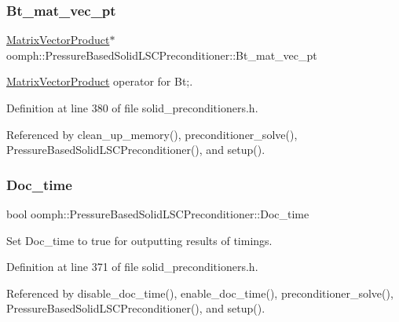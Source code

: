 \subsubsection{\texorpdfstring{Bt\+\_\+mat\+\_\+vec\+\_\+pt}{Bt\_mat\_vec\_pt}}
{\footnotesize\ttfamily \hyperlink{classoomph_1_1MatrixVectorProduct}{Matrix\+Vector\+Product}$\ast$ oomph\+::\+Pressure\+Based\+Solid\+L\+S\+C\+Preconditioner\+::\+Bt\+\_\+mat\+\_\+vec\+\_\+pt\hspace{0.3cm}{\ttfamily [private]}}



\hyperlink{classoomph_1_1MatrixVectorProduct}{Matrix\+Vector\+Product} operator for Bt;. 



Definition at line 380 of file solid\+\_\+preconditioners.\+h.



Referenced by clean\+\_\+up\+\_\+memory(), preconditioner\+\_\+solve(), Pressure\+Based\+Solid\+L\+S\+C\+Preconditioner(), and setup().

\mbox{\label{classoomph_1_1PressureBasedSolidLSCPreconditioner_a6bb97a362c82d3a363ffaaceb7a643a8}} 
\subsubsection{\texorpdfstring{Doc\+\_\+time}{Doc\_time}}
{\footnotesize\ttfamily bool oomph\+::\+Pressure\+Based\+Solid\+L\+S\+C\+Preconditioner\+::\+Doc\+\_\+time\hspace{0.3cm}{\ttfamily [private]}}



Set Doc\+\_\+time to true for outputting results of timings. 



Definition at line 371 of file solid\+\_\+preconditioners.\+h.



Referenced by disable\+\_\+doc\+\_\+time(), enable\+\_\+doc\+\_\+time(), preconditioner\+\_\+solve(), Pressure\+Based\+Solid\+L\+S\+C\+Preconditioner(), and setup().

\mbox{\label{classoomph_1_1PressureBasedSolidLSCPreconditioner_a5c6f62a80349652aeff75140ec9c54f1}} 
